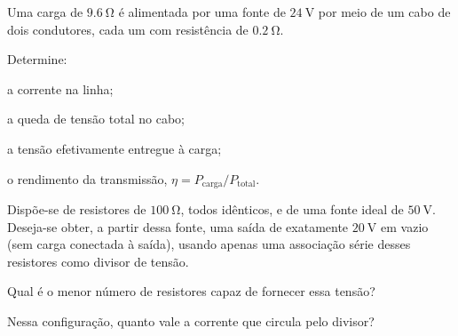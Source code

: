 \blocoaprofundamento
\begin{questao}[3]{}

Uma carga de $\SI{9.6}{\ohm}$ é alimentada por uma fonte de $\SI{24}{\volt}$ por
meio de um cabo de dois condutores, cada um com resistência de
$\SI{0.2}{\ohm}$.


Determine:
\begin{itensq}
\item a corrente na linha;
\item a queda de tensão total no cabo;
\item a tensão efetivamente entregue à carga;
\item o rendimento da transmissão, $\eta = P_{\text{carga}}/P_{\text{total}}$.
\end{itensq}


\end{questao}
\begin{questao}[3]{}

Dispõe-se de resistores de $\SI{100}{\ohm}$, todos idênticos, e de uma fonte
ideal de $\SI{50}{\volt}$. Deseja-se obter, a partir dessa fonte, uma saída de
exatamente $\SI{20}{\volt}$ em vazio (sem carga conectada à saída), usando apenas
uma associação série desses resistores como divisor de tensão.
\begin{itensq}
\item Qual é o menor número de resistores capaz de fornecer essa tensão?
\item Nessa configuração, quanto vale a corrente que circula pelo divisor?
\end{itensq}


\end{questao}
